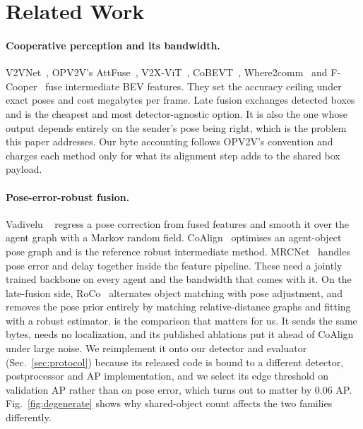 \section{Related Work}
\label{sec:related}



\paragraph{Cooperative perception and its bandwidth.}
V2VNet~\cite{wang2020v2vnet}, OPV2V's AttFuse~\cite{xu2022opv2v}, V2X-ViT~\cite{xu2022v2xvit}, CoBEVT~\cite{xu2022cobevt}, Where2comm~\cite{hu2022where2comm} and F-Cooper~\cite{chen2019fcooper} fuse intermediate BEV features. They set the accuracy ceiling under exact poses and cost megabytes per frame. Late fusion exchanges detected boxes and is the cheapest and most detector-agnostic option. It is also the one whose output depends entirely on the sender's pose being right, which is the problem this paper addresses. Our byte accounting follows OPV2V's convention and charges each method only for what its alignment step adds to the shared box payload.

\paragraph{Pose-error-robust fusion.}
Vadivelu \etal~\cite{vadivelu2020learning} regress a pose correction from fused features and smooth it over the agent graph with a Markov random field. CoAlign~\cite{lu2023coalign} optimises an agent-object pose graph and is the reference robust intermediate method. MRCNet~\cite{hong2024mrcnet} handles pose error and delay together inside the feature pipeline. These need a jointly trained backbone on every agent and the bandwidth that comes with it. On the late-fusion side, RoCo~\cite{huang2024roco} alternates object matching with pose adjustment, and \freealign~\cite{lei2024freealign} removes the pose prior entirely by matching relative-distance graphs and fitting with a robust estimator. \freealign is the comparison that matters for us. It sends the same bytes, needs no localization, and its published ablations put it ahead of CoAlign under large noise. We reimplement it onto our detector and evaluator (Sec.~\ref{sec:protocol}) because its released code is bound to a different detector, postprocessor and AP implementation, and we select its edge threshold on validation AP rather than on pose error, which turns out to matter by 0.06 AP. Fig.~\ref{fig:degenerate} shows why shared-object count affects the two families differently.

